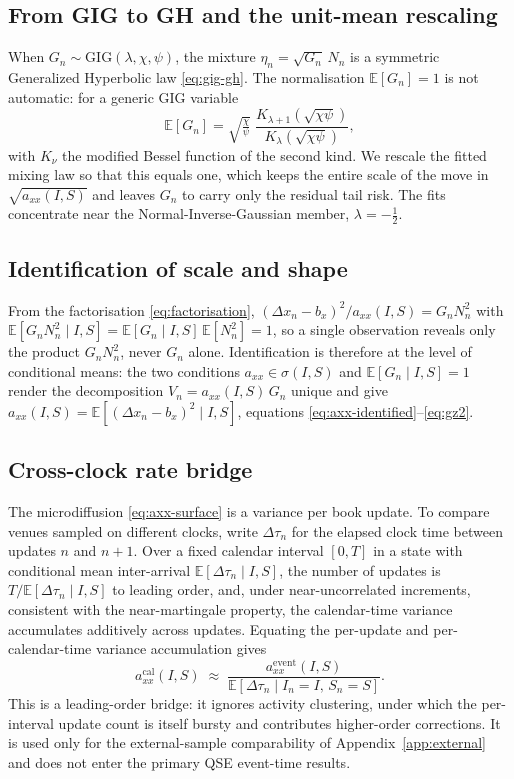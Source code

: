 \documentclass[11pt]{article}
\theoremstyle{plain}
\theoremstyle{definition}
\newcommand{\E}{\mathbb{E}}
\newcommand{\GIG}{\mathrm{GIG}}
\newcommand{\axx}{a_{xx}}
\begin{document}
\subsection{From GIG to GH and the unit-mean rescaling}
\label{app:giggh}
When $G_n\sim\GIG(\lambda,\chi,\psi)$, the mixture $\eta_n=\sqrt{G_n}\,N_n$ is a symmetric
Generalized Hyperbolic law \eqref{eq:gig-gh}. The normalisation $\E[G_n]=1$ is not
automatic: for a generic GIG variable
\begin{equation*}
  \E[G_n] = \sqrt{\tfrac{\chi}{\psi}}\;
  \frac{K_{\lambda+1}\!\left(\sqrt{\chi\psi}\right)}{K_{\lambda}\!\left(\sqrt{\chi\psi}\right)},
\end{equation*}
with $K_\nu$ the modified Bessel function of the second kind. We rescale the fitted mixing
law so that this equals one, which keeps the entire scale of the move in
$\sqrt{\axx(I,S)}$ and leaves $G_n$ to carry only the residual tail risk. The fits
concentrate near the Normal-Inverse-Gaussian member, $\lambda=-\tfrac12$.

\subsection{Identification of scale and shape}
\label{app:ident}
From the factorisation \eqref{eq:factorisation}, $(\Delta x_n-b_x)^2/\axx(I,S)=G_n N_n^2$
with $\E[G_n N_n^2\mid I,S]=\E[G_n\mid I,S]\,\E[N_n^2]=1$, so a single observation reveals
only the product $G_n N_n^2$, never $G_n$ alone. Identification is therefore at the level
of conditional means: the two conditions $\axx\in\sigma(I,S)$ and $\E[G_n\mid I,S]=1$
render the decomposition $V_n=\axx(I,S)\,G_n$ unique and give
$\axx(I,S)=\E[(\Delta x_n-b_x)^2\mid I,S]$, equations
\eqref{eq:axx-identified}--\eqref{eq:gz2}.

\subsection{Cross-clock rate bridge}
\label{app:bridge}
The microdiffusion \eqref{eq:axx-surface} is a variance per book update. To compare venues
sampled on different clocks, write $\Delta\tau_n$ for the elapsed clock time between updates
$n$ and $n+1$. Over a fixed calendar interval $[0,T]$ in a state with conditional mean
inter-arrival $\E[\Delta\tau_n\mid I,S]$, the number of updates is
$T/\E[\Delta\tau_n\mid I,S]$ to leading order, and, under near-uncorrelated increments,
consistent with the near-martingale property, the calendar-time variance accumulates
additively across updates. Equating the per-update and per-calendar-time variance
accumulation gives
\begin{equation}
  a^{\mathrm{cal}}_{xx}(I,S)
  \;\approx\;
  \frac{a^{\mathrm{event}}_{xx}(I,S)}{\E\!\left[\Delta\tau_n \mid I_n=I,\,S_n=S\right]} .
  \label{eq:bridge}
\end{equation}
This is a leading-order bridge: it ignores activity clustering, under which the
per-interval update count is itself bursty and contributes higher-order corrections. It is
used only for the external-sample comparability of Appendix~\ref{app:external} and does not
enter the primary QSE event-time results.
\end{document}
